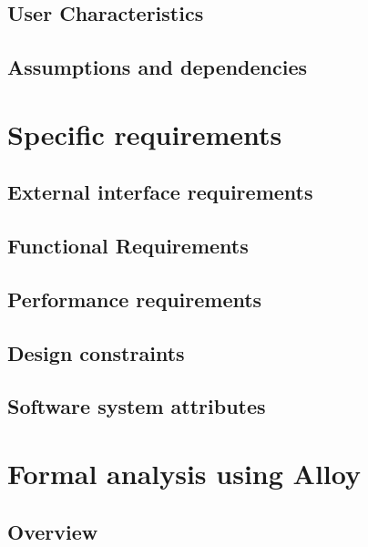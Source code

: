   \section{User Characteristics}
  
  \section{Assumptions and dependencies}
  
  
  \chapter{Specific requirements}
  \section{External interface requirements}
  
  \section{Functional Requirements}
  
  \section{Performance requirements}
  
  \section{Design constraints}
  
  \section{Software system attributes}
  

  \chapter{Formal analysis using Alloy}
  \section{Overview}
  
